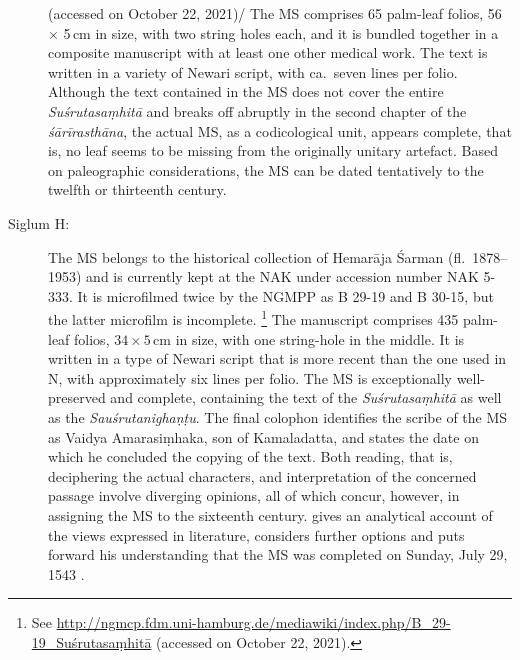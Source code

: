 \begin{description}
{ (accessed on October 22, 2021)/
    } 
The MS comprises 65 palm-leaf folios, 56 $\times$ 5\,cm in size, with two string holes each, 
and it is bundled together in a composite manuscript with at least one other medical work. 
The text is written in a variety of Newari script, with ca.\ seven lines per folio. Although the 
text contained in the MS does not cover the entire \emph{Suśrutasaṃhitā} and breaks off 
abruptly in the second chapter of the \emph{śārīrasthāna}, the actual MS, as a codicological 
unit, appears complete, that is, no leaf seems to be missing from the originally unitary 
artefact. Based on paleographic considerations, the MS can be dated tentatively to the twelfth 
or thirteenth century.

\item[Siglum H:] The MS belongs to the historical collection of Hemarāja Śarman (fl.\ 
1878--1953) and is currently kept at the NAK under accession number NAK 5-333. It is 
microfilmed twice by the NGMPP as B 29-19 and B 30-15, but the latter microfilm is 
incomplete.%
    \footnote{%
    See 
    \url{http://ngmcp.fdm.uni-hamburg.de/mediawiki/index.php/B_29-19_Suśrutasaṃhitā}
     (accessed on October 22, 2021).
    } 
The manuscript comprises 435 palm-leaf folios,  $34\times5$\,cm in size, with one string-hole 
in the 
middle. It is written in a type of Newari script that is more recent than the one used in N, with 
approximately six lines per folio. The MS is exceptionally well-preserved and complete, 
containing the text of the \emph{Suśrutasaṃhitā} as well as the \emph{Sauśrutanighaṇṭu}. 
The final colophon identifies the scribe of the MS as Vaidya Amarasiṃhaka, son of 
Kamaladatta, and states the date on which he concluded the copying of the text. Both 
reading, that is, deciphering the actual characters, and interpretation of the concerned 
passage involve diverging opinions, all of which concur, however, in assigning the MS to the 
sixteenth century. \textcites[21--26]{kleb-2021b} gives an analytical account of the views 
expressed in literature, considers further options and puts forward his understanding that the 
MS was completed on Sunday, July 29, 1543 \CE.  
\end{description}
  
